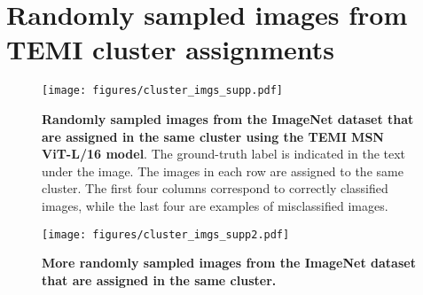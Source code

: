 \documentclass{bmvc2k}
\begin{document}
\section{Randomly sampled images from TEMI cluster assignments}
\enlargethispage{1\baselineskip}
\label{appendix:random-image-samples}
\begin{figure}[H]
\onecolumn\texttt{[image: figures/cluster\_imgs\_supp.pdf]}
\vspace{0.3cm}
\caption{\textbf{Randomly sampled images from the ImageNet dataset that are assigned in the same cluster using the TEMI MSN ViT-L/16 model}. The ground-truth label is indicated in the text under the image. The images in each row are assigned to the same cluster. The first four columns correspond to correctly classified images, while the last four are examples of misclassified images.}
\end{figure}
\clearpage
\begin{figure*}[h!]
\texttt{[image: figures/cluster\_imgs\_supp2.pdf]}
\vspace{0.3cm}
\caption{\textbf{More randomly sampled images from the ImageNet dataset that are assigned in the same cluster.}}
\end{figure*}
\end{document}
